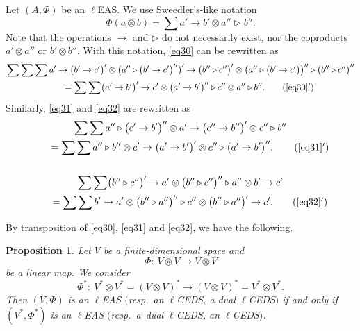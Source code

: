 \documentclass[10pt,a4paper]{amsart}
\numberwithin{equation}{section}
\newtheorem{Proposition}[Theorem]{Proposition}
 { \theoremstyle{definition}
\newtheorem{Definition}[Theorem]{Definition}
\newtheorem{Note}[Theorem]{Note}
\newtheorem{Example}[Theorem]{Example}
\newtheorem{Remark}[Theorem]{Remark}
\newtheorem{Notation}[Theorem]{Notation}}
\begin{document}
\begin{Notation}
Let $(A,\Phi)$ be an $\ell$EAS. We use Sweedler's-like notation
\[
\Phi(a\otimes b)=\sum a'\rightarrow b' \otimes a''\triangleright b''.
\]
Note that the operations $\rightarrow$ and $\triangleright$ do not necessarily exist, nor the coproducts $a'\otimes a''$ or $b'\otimes b''$.
With this notation, \eqref{eq30} can be rewritten as
\begin{gather}
\sum\sum\sum a' \rightarrow \bigl(b' \rightarrow c'\bigr)'\otimes \bigl(a'' \triangleright \bigl(b' \rightarrow c'\bigr)''\bigr)'\rightarrow \bigl(b'' \triangleright c''\bigr)' \otimes \bigl(a'' \triangleright \bigl(b' \rightarrow c'\bigr)\bigr)''\triangleright \bigl(b'' \triangleright c''\bigr)''\nonumber\\
 \qquad=\sum\sum \bigl(a' \rightarrow b'\bigr)'\rightarrow c' \otimes \bigl(a' \rightarrow b'\bigr)''\triangleright c'' \otimes a'' \triangleright b''.\tag{\ref{eq30}$'$}
\end{gather}
Similarly, \eqref{eq31} and \eqref{eq32} are rewritten as
\begin{gather}
 \sum\sum a'' \triangleright \bigl(c' \rightarrow b'\bigr)'' \otimes a' \rightarrow \bigl(c'' \rightarrow b''\bigr)'\otimes c'' \triangleright b''\nonumber\\
\qquad=\sum\sum a'' \triangleright b'' \otimes c' \rightarrow \bigl(a' \rightarrow b'\bigr)'\otimes c'' \triangleright \bigl(a' \rightarrow b'\bigr)'',\tag{\ref{eq31}$'$}\\
\nonumber\\
 \sum\sum \bigl(b'' \triangleright c''\bigr)'\rightarrow a'\otimes \bigl(b'' \triangleright c''\bigr)''\triangleright a''\otimes b' \rightarrow c'\nonumber\\
\qquad=\sum\sum b' \rightarrow a' \otimes \bigl(b'' \triangleright a''\bigr)''\triangleright c''\otimes \bigl(b'' \triangleright a''\bigr)'\rightarrow c'.\tag{\ref{eq32}$'$}
\end{gather}\end{Notation}

By transposition of \eqref{eq30}, \eqref{eq31} and \eqref{eq32}, we have the following.

\begin{Proposition}\label{prop4.2}
Let $V$ be a finite-dimensional space and
\[
\Phi\colon \ V\otimes V\longrightarrow V\otimes V
\]
 be a linear map. We consider
\[
\Phi^*\colon \ V^*\otimes V^*=(V\otimes V)^*\longrightarrow(V\otimes V)^*=V^*\otimes V^*.
\]
Then $(V,\Phi)$ is an $\ell$EAS $($resp.\ an $\ell$CEDS, a dual $\ell$CEDS$)$ if and only if $(V^*,\Phi^*)$ is an $\ell$EAS $($resp.\ a~dual $\ell$CEDS, an $\ell$CEDS$)$.
\end{Proposition}
\end{document}
